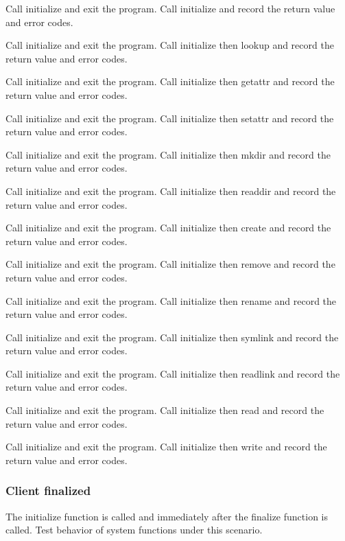 \documentclass[12pt]{article} %
\begin{document}
\begin{list}{.}{}
\item Call initialize and exit the program.  Call initialize and record the return value and error codes.
\item Call initialize and exit the program.  Call initialize then lookup and record the return value and error codes.
\item Call initialize and exit the program.  Call initialize then getattr and record the return value and error codes.
\item Call initialize and exit the program.  Call initialize then setattr and record the return value and error codes.
\item Call initialize and exit the program.  Call initialize then mkdir and record the return value and error codes.
\item Call initialize and exit the program.  Call initialize then readdir and record the return value and error codes.
\item Call initialize and exit the program.  Call initialize then create and record the return value and error codes.
\item Call initialize and exit the program.  Call initialize then remove and record the return value and error codes.
\item Call initialize and exit the program.  Call initialize then rename and record the return value and error codes.
\item Call initialize and exit the program.  Call initialize then symlink and record the return value and error codes.
\item Call initialize and exit the program.  Call initialize then readlink and record the return value and error codes.
\item Call initialize and exit the program.  Call initialize then read and record the return value and error codes.
\item Call initialize and exit the program.  Call initialize then write and record the return value and error codes.
\end{list}

\subsubsection{Client finalized}
The initialize function is called and immediately after the finalize function is called.  Test behavior of system functions under this scenario.
\end{document}
